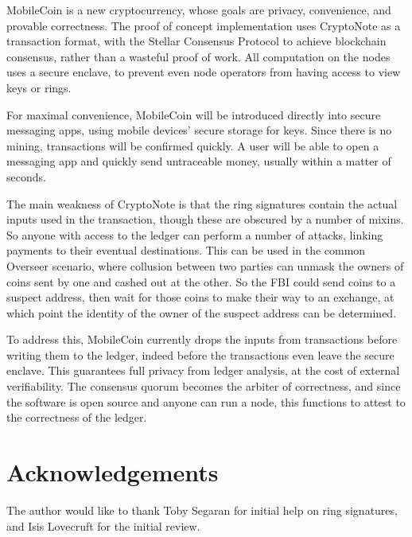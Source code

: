 \documentclass{article}
\begin{document}
MobileCoin is a new cryptocurrency, whose goals are privacy, convenience, and provable correctness.  The proof of concept implementation uses CryptoNote as a transaction format, with the Stellar Consensus Protocol to achieve blockchain consensus, rather than a wasteful proof of work.  All computation on the nodes uses a secure enclave, to prevent even node operators from having access to view keys or rings.  

For maximal convenience, MobileCoin will be introduced directly into secure messaging apps, using mobile devices' secure storage for keys.  Since there is no mining, transactions will be confirmed quickly.  A user will be able to open a messaging app and quickly send untraceable money, usually within a matter of seconds.

The main weakness of CryptoNote is that the ring signatures contain the actual inputs used in the transaction, though these are obscured by a number of mixins.  So anyone with access to the ledger can perform a number of attacks, linking payments to their eventual destinations.  This can be used in the common Overseer scenario, where collusion between two parties can unmask the owners of coins sent by one and cashed out at the other.  So the FBI could send coins to a suspect address, then wait for those coins to make their way to an exchange, at which point the identity of the owner of the suspect address can be determined.

To address this, MobileCoin currently drops the inputs from transactions before writing them to the ledger, indeed before the transactions even leave the secure enclave.  This guarantees full privacy from ledger analysis, at the cost of external verifiability.  The consensus quorum becomes the arbiter of correctness, and since the software is open source and anyone can run a node, this functions to attest to the correctness of the ledger.



\section{Acknowledgements}

The author would like to thank Toby Segaran for initial help on ring signatures, and Isis Lovecruft for the initial review.
\end{document}
